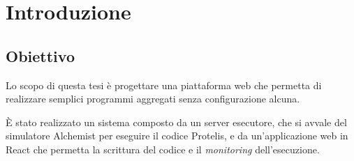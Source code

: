 \section{Introduzione}
  \subsection{Obiettivo}
  \begin{frame}{\insertsection}{\insertsubsection}

    Lo scopo di questa tesi è progettare una piattaforma web che permetta di realizzare semplici programmi aggregati senza configurazione alcuna.

    \medskip
    \pause

    È stato realizzato un sistema composto da un server esecutore, che si avvale del simulatore Alchemist per eseguire il codice Protelis,
    e da un'applicazione web in React che permetta la scrittura del codice e il \emph{monitoring} dell'esecuzione.

  \end{frame}
